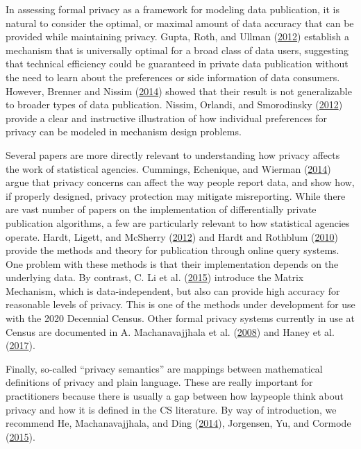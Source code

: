 \documentclass[]{article}
\begin{document}
In assessing formal privacy as a framework for modeling data
publication, it is natural to consider the optimal, or maximal amount of
data accuracy that can be provided while maintaining privacy. Gupta,
Roth, and Ullman
(\protect\hyperlink{ref-Gupta:2012:ICP:2238936.2238961}{2012}) establish
a mechanism that is universally optimal for a broad class of data users,
suggesting that technical efficiency could be guaranteed in private data
publication without the need to learn about the preferences or side
information of data consumers. However, Brenner and Nissim
(\protect\hyperlink{ref-BrennerNissim:Impossibility:SIAM:2014}{2014})
showed that their result is not generalizable to broader types of data
publication. Nissim, Orlandi, and Smorodinsky
(\protect\hyperlink{ref-Nissim:2012:PMD:2229012.2229073}{2012}) provide
a clear and instructive illustration of how individual preferences for
privacy can be modeled in mechanism design problems.

Several papers are more directly relevant to understanding how privacy
affects the work of statistical agencies. Cummings, Echenique, and
Wierman (\protect\hyperlink{ref-cummings:empirical:corr:2014}{2014})
argue that privacy concerns can affect the way people report data, and
show how, if properly designed, privacy protection may mitigate
misreporting. While there are vast number of papers on the
implementation of differentially private publication algorithms, a few
are particularly relevant to how statistical agencies operate. Hardt,
Ligett, and McSherry
(\protect\hyperlink{ref-Hardt:Simple:NIPS:2012}{2012}) and Hardt and
Rothblum (\protect\hyperlink{ref-Hardt:Multiplicative:FOCS10}{2010})
provide the methods and theory for publication through online query
systems. One problem with these methods is that their implementation
depends on the underlying data. By contrast, C. Li et al.
(\protect\hyperlink{ref-li:matrix:VLDB:2015}{2015}) introduce the Matrix
Mechanism, which is data-independent, but also can provide high accuracy
for reasonable levels of privacy. This is one of the methods under
development for use with the 2020 Decennial Census. Other formal privacy
systems currently in use at Census are documented in A. Machanavajjhala
et al. (\protect\hyperlink{ref-Machanavajjhala:OTM:ICDE:2008}{2008}) and
Haney et al. (\protect\hyperlink{ref-HaneySIGMOD2017}{2017}).

Finally, so-called ``privacy semantics'' are mappings between
mathematical definitions of privacy and plain language. These are really
important for practitioners because there is usually a gap between how
laypeople think about privacy and how it is defined in the CS
literature. By way of introduction, we recommend He, Machanavajjhala,
and Ding (\protect\hyperlink{ref-He:Blowfish:ACMSIGMOD:2014}{2014}),
Jorgensen, Yu, and Cormode
(\protect\hyperlink{ref-jorgensen:personalized:ICDE:2015}{2015}).
\end{document}
